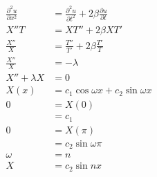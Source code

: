 \documentclass{article}
\begin{document}
\begin{align*}
  \frac{\partial^2 u}{\partial x^2}    & = \frac{\partial^2 u}{\partial t^2} + 2 \beta \frac{\partial u}{\partial t}                                                            \\
  X'' T                                & = X T'' + 2 \beta X T'                                                                                                                 \\
  \frac{X''}{X}                        & = \frac{T''}{T'} + 2 \beta \frac{T'}{T}                                                                                                \\
  \frac{X''}{X}                        & = -\lambda                                                                                                                             \\
  X'' + \lambda X                      & = 0                                                                                                                                    \\
  X(x)                                 & = c_1 \cos \omega x + c_2 \sin \omega x                                                                                                \\
  0                                    & = X(0)                                                                                                                                 \\
                                       & = c_1                                                                                                                                  \\
  0                                    & = X(\pi)                                                                                                                               \\
                                       & = c_2 \sin \omega \pi                                                                                                                  \\
  \omega                               & = n                                                                                                                                    \\
  X                                    & = c_2 \sin n x                                                                                                                         \\

\end{align*}
\end{document}
